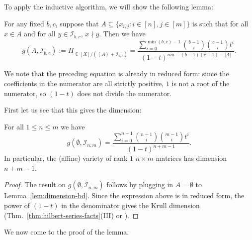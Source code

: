 \documentclass[11pt,reqno]{amsart}
\DeclareMathOperator{\C}{\mathbb{C}}
\newcommand{\suchthat}{:}
\newcommand{\ideal}[1]{\left\langle#1\right\rangle}
\theoremstyle{definition}
\numberwithin{equation}{section}
\begin{document}
To apply the inductive algorithm, we will show the following lemma:

\begin{lemma} \label{lem:dimension-bd}
For any fixed $b, c$, suppose that $A \subseteq \{x_{i, j} \suchthat i \in [n], j \in [m]\}$ is such that for all $x \in A$ and for all $y \in \mathcal{I}_{b, c}$, $x \nmid y$. Then we have
\begin{equation} \label{eqn:general-hp-series-big}
g(A, \mathcal{I}_{b, c}) := H_{\C[X] / (\ideal{A} + \mathcal{I}_{b, c})} = \frac{\sum_{i=0}^{\min(b, c) - 1} \binom{b-1}{i}\binom{c-1}{i} t^i}{(1 - t)^{nm - (b-1)(c-1) - |A|}}.
\end{equation}
\end{lemma}

We note that the preceding equation is already in reduced form: since the coefficients in the numerator are all strictly positive, $1$ is not a root of the numerator, so $(1-t)$ does not divide the numerator.

First let us see that this gives the dimension:

\begin{corollary}
For all $1 \leq n \leq m$ we have
\begin{equation} \label{eqn:hilbert-series-m-n}
g(\emptyset, \mathcal{I}_{n, m}) = \frac{\sum_{i=0}^{n - 1} \binom{n-1}{i}\binom{m-1}{i}t^i}{(1 - t)^{n + m - 1}}.
\end{equation}
In particular, the (affine) variety of rank $1$ $n \times m$ matrices has dimension $n+m-1$.
\end{corollary}

\begin{proof}
The result on $g(\emptyset, \mathcal{I}_{n,m})$ follows by plugging in $A = \emptyset$ to Lemma~\ref{lem:dimension-bd}. Since the expression above is in reduced form, the power of $(1-t)$ in the denominator gives the Krull dimension (Thm.~\ref{thm:hilbert-series-facts}(III) or \cite[Definition 5.4.1 + Theorem 5.6.36]{kreuzer-robbiano-2}).
\end{proof}

We now come to the proof of the lemma.
\end{document}
